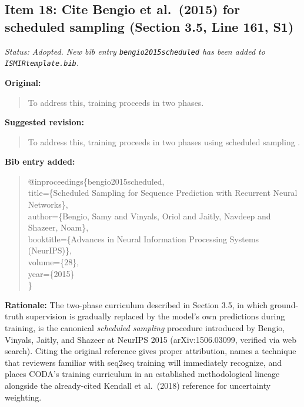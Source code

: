\documentclass{article}
\begin{document}
\subsection*{Item 18: Cite Bengio et al.\ (2015) for scheduled sampling (Section 3.5, Line 161, S1)}

\textit{Status: Adopted. New bib entry \texttt{bengio2015scheduled} has been added to \texttt{ISMIRtemplate.bib}.}

\textbf{Original:}
\begin{quote}
To address this, training proceeds in two phases.
\end{quote}

\textbf{Suggested revision:}
\begin{quote}
To address this, training proceeds in two phases using scheduled sampling \cite{bengio2015scheduled}.
\end{quote}

\textbf{Bib entry added:}
\begin{quote}\small\ttfamily
@inproceedings\{bengio2015scheduled,\\
\hspace*{1em}title=\{Scheduled Sampling for Sequence Prediction with Recurrent Neural Networks\},\\
\hspace*{1em}author=\{Bengio, Samy and Vinyals, Oriol and Jaitly, Navdeep and Shazeer, Noam\},\\
\hspace*{1em}booktitle=\{Advances in Neural Information Processing Systems (NeurIPS)\},\\
\hspace*{1em}volume=\{28\},\\
\hspace*{1em}year=\{2015\}\\
\}
\end{quote}

\textbf{Rationale:}
The two-phase curriculum described in Section 3.5, in which ground-truth supervision is gradually replaced by the model's own predictions during training, is the canonical \emph{scheduled sampling} procedure introduced by Bengio, Vinyals, Jaitly, and Shazeer at NeurIPS 2015 (arXiv:1506.03099, verified via web search). Citing the original reference gives proper attribution, names a technique that reviewers familiar with seq2seq training will immediately recognize, and places CODA's training curriculum in an established methodological lineage alongside the already-cited Kendall et al.\ (2018) reference for uncertainty weighting.
\end{document}
